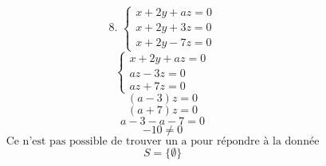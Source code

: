 \documentclass{article}
\begin{document}
\[
\text{8. } \begin{cases} x + 2y + az = 0 \\ x + 2y + 3z = 0 \\ x + 2y - 7z = 0 \end{cases}
\]
\[
\begin{cases} x + 2y + az = 0 \\ az - 3z = 0 \\ az + 7z = 0 \end{cases}
\]
\[
(a-3)z = 0
\]
\[
(a+7)z = 0
\]
\[
a - 3 - a - 7 = 0
\]
\[
-10 \neq 0
\]
\[
\text{Ce n'est pas possible de trouver un a pour répondre à la donnée}
\]
\[
S = \{\emptyset\}
\]
\end{document}
